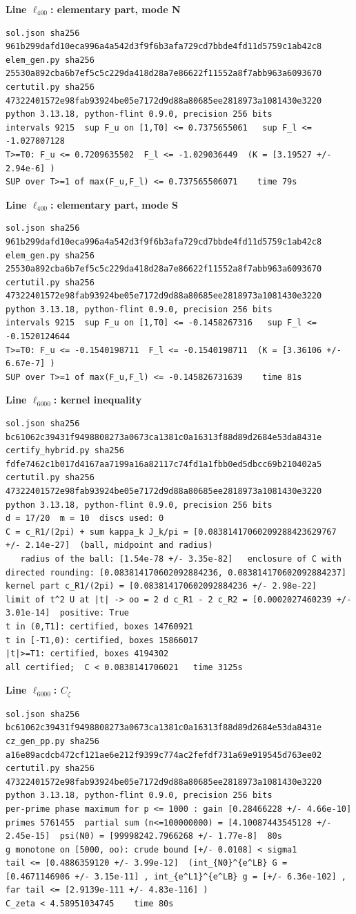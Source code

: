 \documentclass[11pt,reqno]{amsart}
\numberwithin{equation}{section}
\theoremstyle{definition}
\theoremstyle{remark}
\newcommand{\appsub}[1]{\par\medskip\noindent\textbf{#1}\par\nobreak\smallskip}
\begin{document}
\appsub{Line $\ell_{400}$: elementary part, mode N}
\begin{lstlisting}
sol.json sha256 961b299dafd10eca996a4a542d3f9f6b3afa729cd7bbde4fd11d5759c1ab42c8
elem_gen.py sha256 25530a892cba6b7ef5c5c229da418d28a7e86622f11552a8f7abb963a6093670
certutil.py sha256 47322401572e98fab93924be05e7172d9d88a80685ee2818973a1081430e3220
python 3.13.18, python-flint 0.9.0, precision 256 bits
intervals 9215  sup F_u on [1,T0] <= 0.7375655061   sup F_l <= -1.027807128
T>=T0: F_u <= 0.7209635502  F_l <= -1.029036449  (K = [3.19527 +/- 2.94e-6] )
SUP over T>=1 of max(F_u,F_l) <= 0.737565506071    time 79s
\end{lstlisting}
\appsub{Line $\ell_{400}$: elementary part, mode S}
\begin{lstlisting}
sol.json sha256 961b299dafd10eca996a4a542d3f9f6b3afa729cd7bbde4fd11d5759c1ab42c8
elem_gen.py sha256 25530a892cba6b7ef5c5c229da418d28a7e86622f11552a8f7abb963a6093670
certutil.py sha256 47322401572e98fab93924be05e7172d9d88a80685ee2818973a1081430e3220
python 3.13.18, python-flint 0.9.0, precision 256 bits
intervals 9215  sup F_u on [1,T0] <= -0.1458267316   sup F_l <= -0.1520124644
T>=T0: F_u <= -0.1540198711  F_l <= -0.1540198711  (K = [3.36106 +/- 6.67e-7] )
SUP over T>=1 of max(F_u,F_l) <= -0.145826731639    time 81s
\end{lstlisting}
\appsub{Line $\ell_{6000}$: kernel inequality}
\begin{lstlisting}
sol.json sha256 bc61062c39431f9498808273a0673ca1381c0a16313f88d89d2684e53da8431e
certify_hybrid.py sha256 fdfe7462c1b017d4167aa7199a16a82117c74fd1a1fbb0ed5dbcc69b210402a5
certutil.py sha256 47322401572e98fab93924be05e7172d9d88a80685ee2818973a1081430e3220
python 3.13.18, python-flint 0.9.0, precision 256 bits
d = 17/20  m = 10  discs used: 0 
C = c_R1/(2pi) + sum kappa_k J_k/pi = [0.08381417060209288423629767 +/- 2.14e-27]  (ball, midpoint and radius)
   radius of the ball: [1.54e-78 +/- 3.35e-82]   enclosure of C with directed rounding: [0.083814170602092884236, 0.083814170602092884237]
kernel part c_R1/(2pi) = [0.083814170602092884236 +/- 2.98e-22]
limit of t^2 U at |t| -> oo = 2 d c_R1 - 2 c_R2 = [0.0002027460239 +/- 3.01e-14]  positive: True
t in (0,T1]: certified, boxes 14760921
t in [-T1,0): certified, boxes 15866017
|t|>=T1: certified, boxes 4194302
all certified;  C < 0.0838141706021   time 3125s
\end{lstlisting}
\appsub{Line $\ell_{6000}$: $C_\zeta$}
\begin{lstlisting}
sol.json sha256 bc61062c39431f9498808273a0673ca1381c0a16313f88d89d2684e53da8431e
cz_gen_pp.py sha256 a16e89acdcb472cf121ae6e212f9399c774ac2fefdf731a69e919545d763ee02
certutil.py sha256 47322401572e98fab93924be05e7172d9d88a80685ee2818973a1081430e3220
python 3.13.18, python-flint 0.9.0, precision 256 bits
per-prime phase maximum for p <= 1000 : gain [0.28466228 +/- 4.66e-10]
primes 5761455  partial sum (n<=100000000) = [4.10087443545128 +/- 2.45e-15]  psi(N0) = [99998242.7966268 +/- 1.77e-8]  80s
g monotone on [5000, oo): crude bound [+/- 0.0108] < sigma1
tail <= [0.4886359120 +/- 3.99e-12]  (int_{N0}^{e^LB} G = [0.4671146906 +/- 3.15e-11] , int_{e^L1}^{e^LB} g = [+/- 6.36e-102] , far tail <= [2.9139e-111 +/- 4.83e-116] )
C_zeta < 4.58951034745    time 80s
\end{lstlisting}
\end{document}
